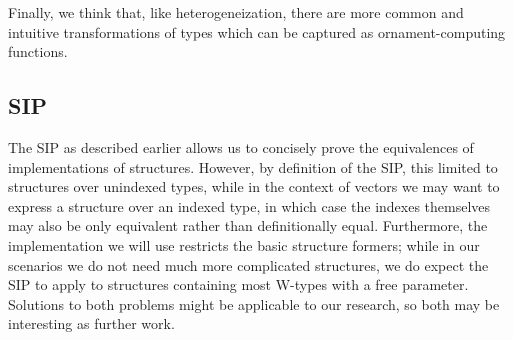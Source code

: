 Finally, we think that, like heterogeneization, there are more common and intuitive transformations of types which can be captured as ornament-computing functions.



\subsection{SIP}
The SIP as described earlier allows us to concisely prove the equivalences of implementations of structures. However, by definition of the SIP, this limited to structures over unindexed types, while in the context of vectors we may want to express a structure over an indexed type, in which case the indexes themselves may also be only equivalent rather than definitionally equal. Furthermore, the implementation we will use \cite{iri} restricts the basic structure formers; while in our scenarios we do not need much more complicated structures, we do expect the SIP to apply to structures containing most W-types with a free parameter. Solutions to both problems might be applicable to our research, so both may be interesting as further work.



